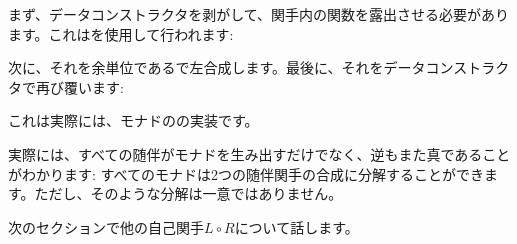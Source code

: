 まず、データコンストラクタを剥がして、関手内の関数を露出させる必要があります。これはを使用して行われます: 

次に、それを余単位であるで左合成します。最後に、それをデータコンストラクタで再び覆います: 

これは実際には、モナドのの実装です。

実際には、すべての随伴がモナドを生み出すだけでなく、逆もまた真であることがわかります: すべてのモナドは2つの随伴関手の合成に分解することができます。ただし、そのような分解は一意ではありません。

次のセクションで他の自己関手$L \circ R$について話します。
